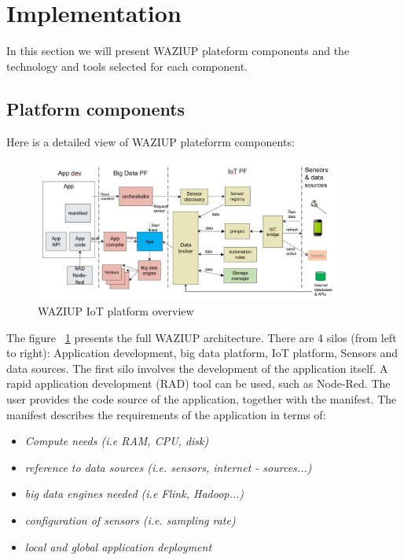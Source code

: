 
\section{Implementation}
In this section we will present WAZIUP plateform components and the technology and tools selected for each component.

\subsection{Platform components}
Here is a detailed view of WAZIUP plateforrm components:

\begin{figure}[h!]
\centering
\includegraphics[width=0.9\textwidth]{figs/platformOverview.png}
\caption{WAZIUP IoT platform overview}
\label{fig:platformOverview}
\end{figure}

The figure ~\ref{fig:platformOverview} presents the full WAZIUP architecture. 
There are 4 silos (from left to right): Application development, big data platform, IoT platform, Sensors and data sources. 
The first silo involves the development of the application itself. 
A rapid application development (RAD) tool can be used, such as Node-Red. 
The user provides the code source of the application, together with the manifest. 
The manifest describes the requirements of the application in terms of:
\begin{itemize}
	\item \emph{Compute needs (i.e RAM, CPU, disk)}
	\item \emph{reference to data sources (i.e. sensors, internet - sources...)}
	\item \emph{big data engines needed (i.e Flink, Hadoop...)}
	\item \emph{configuration of sensors (i.e. sampling rate)}
	\item \emph{local and global application deployment}
\end{itemize}

